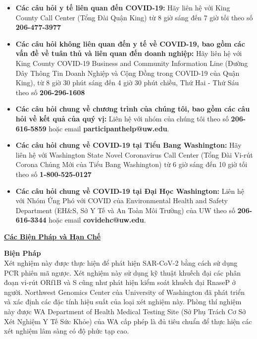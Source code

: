 \documentclass[10pt]{article}
\begin{document}
\begin{itemize}

\item

  \textbf{Các câu hỏi y tế liên quan đến COVID-19:} Hãy liên hệ với King County
  Call Center (Tổng Đài Quận King) từ 8 giờ sáng đến 7 giờ tối theo số
  \textbf{206-477-3977}

\item

  \textbf{Các câu hỏi không liên quan đến y tế về COVID-19, bao gồm các vấn đề
  về tuân thủ và liên quan đến doanh nghiệp:} Hãy liên hệ với King County
  COVID-19 Business and Community Information Line (Đường Dây Thông Tin Doanh
  Nghiệp và Cộng Đồng trong COVID-19 của Quận King), từ 8 giờ 30 phút sáng đến 4
  giờ 30 phút chiều, Thứ Hai - Thứ Sáu theo số \textbf{206-296-1608}

\item

  \textbf{Các câu hỏi chung về chương trình của chúng tôi, bao gồm các câu hỏi
  về kết quả của quý vị:} Liên hệ với nhóm của chúng tôi theo
  số \textbf{206-616-5859} hoặc email \textbf{participanthelp@uw.edu}.

\item

  \textbf{Các câu hỏi chung về COVID-19 tại Tiểu Bang Washington:} Hãy liên hệ
  với Washington State Novel Coronavirus Call Center (Tổng Đài Vi-rút Corona
  Chủng Mới của Tiểu Bang Washington) từ 6 giờ sáng đến 10 giờ tối theo số
  \textbf{1-800-525-0127}

\item
  \textbf{Các câu hỏi chung về COVID-19 tại Đại Học Washington:} Liên hệ với
  Nhóm Ứng Phó với COVID của Environmental Health and Safety Department (EH\&S,
  Sở Y Tế và An Toàn Môi Trường) của UW theo số \textbf{206-616-3344} hoặc email
  \textbf{covidehc@uw.edu}.

\end{itemize}

\bigskip

\large \underline{\textbf{Các Biện Pháp và Hạn Chế}}

\textbf{Biện Pháp}\\
Xét nghiệm này được thực hiện để phát hiện SAR-CoV-2 bằng cách sử dụng PCR phiên
mã ngược. Xét nghiệm này sử dụng kỹ thuật khuếch đại các phân đoạn vi-rút ORf1B
và S cũng như phát hiện kiểm soát khuếch đại RnaseP ở người. Northwest Genomics
Center của University of Washington đã phát triển và xác định các đặc tính hiệu
suất của loại xét nghiệm này. Phòng thí nghiệm này được WA Department of Health
Medical Testing Site (Sở Phụ Trách Cơ Sở Xét Nghiệm Y Tế Sức Khỏe) của WA cấp
phép là đủ tiêu chuẩn để thực hiện các xét nghiệm lâm sàng có độ phức tạp cao.
\end{document}
